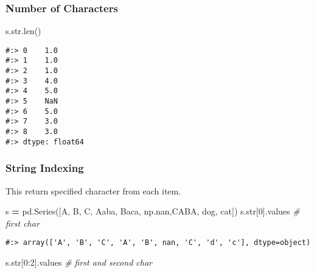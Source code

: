 \documentclass[
]{book}
\newenvironment{Shaded}{\begin{snugshade}}{\end{snugshade}}
\newcommand{\BuiltInTok}[1]{#1}
\newcommand{\CommentTok}[1]{\textcolor[rgb]{0.37,0.37,0.37}{\textit{#1}}}
\newcommand{\DecValTok}[1]{\textcolor[rgb]{0.06,0.06,0.06}{#1}}
\newcommand{\NormalTok}[1]{#1}
\newcommand{\OperatorTok}[1]{\textcolor[rgb]{0.43,0.43,0.43}{\textbf{#1}}}
\newcommand{\StringTok}[1]{\textcolor[rgb]{0.5,0.5,0.5}{#1}}
\begin{document}
\hypertarget{number-of-characters}{%
\subsubsection{Number of Characters}\label{number-of-characters}}

\begin{Shaded}
\begin{Highlighting}[]
\NormalTok{s.}\BuiltInTok{str}\NormalTok{.}\BuiltInTok{len}\NormalTok{()}
\end{Highlighting}
\end{Shaded}

\begin{verbatim}
#:> 0    1.0
#:> 1    1.0
#:> 2    1.0
#:> 3    4.0
#:> 4    5.0
#:> 5    NaN
#:> 6    5.0
#:> 7    3.0
#:> 8    3.0
#:> dtype: float64
\end{verbatim}

\hypertarget{string-indexing}{%
\subsubsection{String Indexing}\label{string-indexing}}

This return specified character from each item.

\begin{Shaded}
\begin{Highlighting}[]
\NormalTok{s }\OperatorTok{=}\NormalTok{ pd.Series([}\StringTok{\textquotesingle{}A\textquotesingle{}}\NormalTok{, }\StringTok{\textquotesingle{}B\textquotesingle{}}\NormalTok{, }\StringTok{\textquotesingle{}C\textquotesingle{}}\NormalTok{, }\StringTok{\textquotesingle{}Aaba\textquotesingle{}}\NormalTok{, }\StringTok{\textquotesingle{}Baca\textquotesingle{}}\NormalTok{, np.nan,}\StringTok{\textquotesingle{}CABA\textquotesingle{}}\NormalTok{, }\StringTok{\textquotesingle{}dog\textquotesingle{}}\NormalTok{, }\StringTok{\textquotesingle{}cat\textquotesingle{}}\NormalTok{])}
\NormalTok{s.}\BuiltInTok{str}\NormalTok{[}\DecValTok{0}\NormalTok{].values    }\CommentTok{\# first char}
\end{Highlighting}
\end{Shaded}

\begin{verbatim}
#:> array(['A', 'B', 'C', 'A', 'B', nan, 'C', 'd', 'c'], dtype=object)
\end{verbatim}

\begin{Shaded}
\begin{Highlighting}[]
\NormalTok{s.}\BuiltInTok{str}\NormalTok{[}\DecValTok{0}\NormalTok{:}\DecValTok{2}\NormalTok{].values  }\CommentTok{\# first and second char}
\end{Highlighting}
\end{Shaded}
\end{document}
